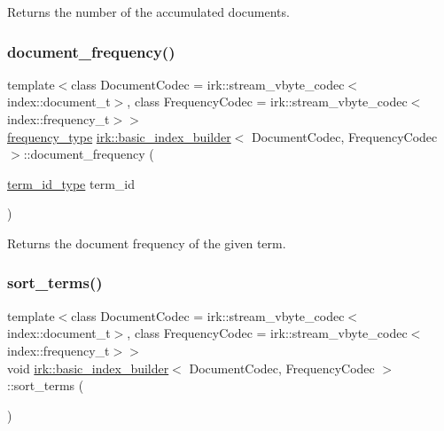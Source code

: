 Returns the number of the accumulated documents. 

\mbox{\label{classirk_1_1basic__index__builder_a43dbe8e0d0274efbce2d37075fd03056}} 
\subsubsection{\texorpdfstring{document\+\_\+frequency()}{document\_frequency()}}
{\footnotesize\ttfamily template$<$class Document\+Codec  = irk\+::stream\+\_\+vbyte\+\_\+codec$<$index\+::document\+\_\+t$>$, class Frequency\+Codec  = irk\+::stream\+\_\+vbyte\+\_\+codec$<$index\+::frequency\+\_\+t$>$$>$ \\
\mbox{\hyperlink{classirk_1_1basic__index__builder_a17364f665244bc4dc6b021f52442f794}{frequency\+\_\+type}} \mbox{\hyperlink{classirk_1_1basic__index__builder}{irk\+::basic\+\_\+index\+\_\+builder}}$<$ Document\+Codec, Frequency\+Codec $>$\+::document\+\_\+frequency (\begin{DoxyParamCaption}\item[{\mbox{\hyperlink{classirk_1_1basic__index__builder_a468351209183fbd35691ab9b75f10d61}{term\+\_\+id\+\_\+type}}}]{term\+\_\+id }\end{DoxyParamCaption})\hspace{0.3cm}{\ttfamily [inline]}}



Returns the document frequency of the given term. 

\mbox{\label{classirk_1_1basic__index__builder_a0c4dec2cdf87c0858b2622aaca7c5eaa}} 
\subsubsection{\texorpdfstring{sort\+\_\+terms()}{sort\_terms()}}
{\footnotesize\ttfamily template$<$class Document\+Codec  = irk\+::stream\+\_\+vbyte\+\_\+codec$<$index\+::document\+\_\+t$>$, class Frequency\+Codec  = irk\+::stream\+\_\+vbyte\+\_\+codec$<$index\+::frequency\+\_\+t$>$$>$ \\
void \mbox{\hyperlink{classirk_1_1basic__index__builder}{irk\+::basic\+\_\+index\+\_\+builder}}$<$ Document\+Codec, Frequency\+Codec $>$\+::sort\+\_\+terms (\begin{DoxyParamCaption}{ }\end{DoxyParamCaption})\hspace{0.3cm}{\ttfamily [inline]}}



